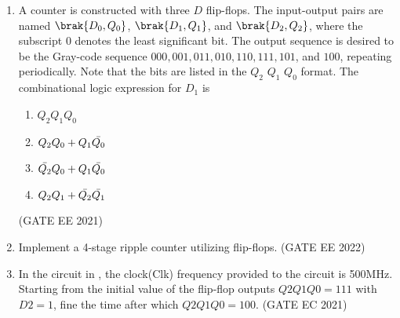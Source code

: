 \begin{enumerate}[label=\arabic*.,ref=\theenumi]
%
\item A counter is constructed with three $D$ flip-flops. The input-output pairs are named $\brak{D_0, Q_0}$, $\brak{D_1, Q_1}$, and $\brak{D_2, Q_2}$, where the subscript $0$ denotes the least significant bit. The output sequence is desired to be the Gray-code sequence $000, 001, 011, 010, 110, 111, 101$, and $100$, repeating periodically. Note that the bits are listed in the $Q_2$  $Q_1$  $Q_0$ format. The combinational logic expression for $D_1$ is
%
\begin{enumerate}
    \item $Q_2 Q_1 Q_0$
    \item $Q_2 Q_0 + Q_1 \Bar{Q_0}$
    \item $\Bar{Q_2} Q_0 + Q_1 \Bar{Q_0}$
    \item $Q_2 Q_1 + \Bar{Q_2} \Bar{Q_1}$
\end{enumerate}
\hfill(GATE EE 2021)
%
\item Implement a 4-stage ripple counter utilizing flip-flops.
\label{gate-ee-2022-29}
\hfill (GATE EE 2022)
%

%
\item In the circuit in 
	,
\label{prob:gate-ec-46.2021}
the clock(Clk) frequency provided to the circuit is 500MHz.
Starting from the initial value of the flip-flop outputs $Q2Q1Q0 =111$ with $D2=1$, fine the time after which $Q2Q1Q0 = 1 0 0$. 
\hfill (GATE EC 2021)
%
	\begin{figure}[H]
    \centering
\end{figure}
\end{enumerate}
